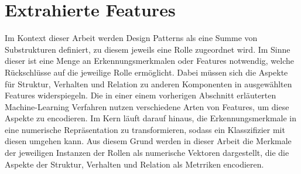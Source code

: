 \section{Extrahierte Features}

Im Kontext dieser Arbeit werden Design Patterns als eine Summe von Substrukturen definiert, zu diesem jeweils eine Rolle zugeordnet wird.
Im Sinne dieser ist eine Menge an Erkennungsmerkmalen oder Features notwendig, welche Rückschlüsse auf die jeweilige Rolle ermöglicht. 
Dabei müssen sich die Aspekte für Struktur, Verhalten und Relation zu anderen Komponenten in ausgewählten Features widerspiegeln.
Die in einer einem vorherigen Abschnitt erläuterten Machine-Learning Verfahren nutzen verschiedene Arten von Features, um diese Aspekte zu encodieren.
Im Kern läuft darauf hinaus, die Erkennungsmerkmale in eine numerische Repräsentation zu transformieren, sodass ein Klasszifizier mit diesen umgehen kann.
Aus diesem Grund werden in dieser Arbeit die Merkmale der jeweiligen Instanzen der Rollen als numerische Vektoren dargestellt, die die Aspekte der Struktur, Verhalten und Relation als Metrriken encodieren.

